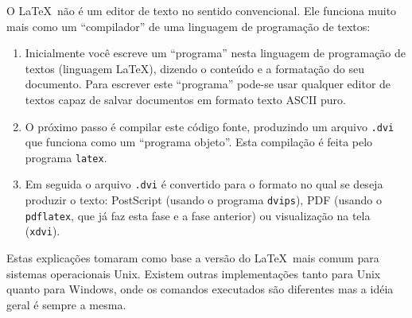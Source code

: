 O \LaTeX\ não é um editor de texto no sentido convencional. Ele funciona
muito mais como um ``compilador'' de uma linguagem de programação de
textos:%
%
\begin{enumerate}
\item Inicialmente você escreve um ``programa'' nesta linguagem de
programação de textos (linguagem \LaTeX), dizendo o conteúdo e a
formatação do seu documento.  Para escrever este ``programa'' pode-se
usar qualquer editor de textos capaz de salvar documentos em formato
texto ASCII puro.
\item O próximo passo é compilar este código fonte, produzindo um arquivo
\texttt{.dvi} que funciona como um ``programa objeto''. Esta compilação
é feita pelo programa \texttt{latex}.
\item Em seguida o arquivo \texttt{.dvi} é convertido para o formato no
qual se deseja produzir o texto: PostScript (usando o programa
\texttt{dvips}), PDF (usando o \texttt{pdflatex}, que já faz esta fase
e a fase anterior) ou visualização na tela (\texttt{xdvi}).
\end{enumerate}
Estas explicações tomaram como base a versão do \LaTeX\ mais comum para
sistemas operacionais Unix. Existem outras implementações tanto para
Unix quanto para Windows, onde os comandos executados são diferentes
mas a idéia geral é sempre a mesma.

